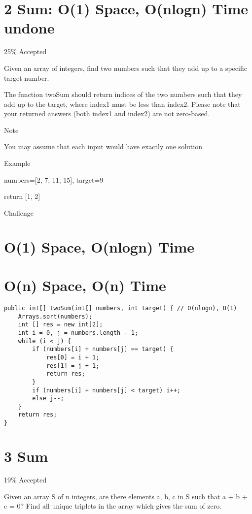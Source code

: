 \documentclass[9pt, b5paaper]{book}
\begin{document}
\section{2 Sum: O(1) Space, O(nlogn) Time undone}
\label{sec-5-2}

25\% Accepted

Given an array of integers, find two numbers such that they add up to a specific target number.

The function twoSum should return indices of the two numbers such that they add up to the target, where index1 must be less than index2. Please note that your returned answers (both index1 and index2) are not zero-based.

Note

You may assume that each input would have exactly one solution

Example

numbers=[2, 7, 11, 15], target=9

return [1, 2]

Challenge

\section{O(1) Space, O(nlogn) Time}
\label{sec-5-3}

\section{O(n) Space, O(n) Time}
\label{sec-5-4}
\begin{verbatim}
public int[] twoSum(int[] numbers, int target) { // O(nlogn), O(1)
    Arrays.sort(numbers);
    int [] res = new int[2];
    int i = 0, j = numbers.length - 1;
    while (i < j) {
        if (numbers[i] + numbers[j] == target) {
            res[0] = i + 1;
            res[1] = j + 1;
            return res;
        }
        if (numbers[i] + numbers[j] < target) i++;
        else j--;
    }
    return res;
}
\end{verbatim}

\section{3 Sum}
\label{sec-5-5}

19\% Accepted

Given an array S of n integers, are there elements a, b, c in S such that a + b + c = 0? Find all unique triplets in the array which gives the sum of zero.
\end{document}
